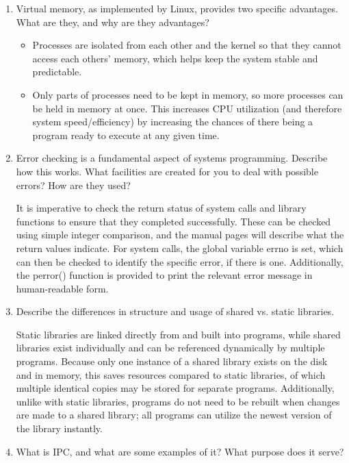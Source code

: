 \documentclass[letterpaper,10pt,onecolumn,titlepage]{article}
\begin{document}
\begin{enumerate}[itemsep=0.1 in]
\item Virtual memory, as implemented by Linux, provides two specific advantages. What are
  they, and why are they advantages?

  \begin{itemize}
    \item Processes are isolated from each other and the kernel so that they cannot access each others' memory, which helps keep the system stable and predictable.
    \item Only parts of processes need to be kept in memory, so more processes can be held in memory at once.  This increases CPU utilization (and therefore system speed/efficiency) by increasing the chances of there being a program ready to execute at any given time.
  \end{itemize}

\item Error checking is a fundamental aspect of systems programming. Describe how this
  works. What facilities are created for you to deal with possible errors? How are they
  used?

  It is imperative to check the return status of system calls and library functions to ensure that they completed successfully.  These can be checked using simple integer comparison, and the manual pages will describe what the return values indicate.  For system calls, the global variable errno is set, which can then be checked to identify the specific error, if there is one.  Additionally, the perror() function is provided to print the relevant error message in human-readable form.

\item Describe the differences in structure and usage of shared vs. static libraries.

Static libraries are linked directly from and built into programs, while shared libraries exist individually and can be referenced dynamically by multiple programs.  Because only one instance of a shared library exists on the disk and in memory, this saves resources compared to static libraries, of which multiple identical copies may be stored for separate programs.  Additionally, unlike with static libraries, programs do not need to be rebuilt when changes are made to a shared library; all programs can utilize the newest version of the library instantly.

\item What is IPC, and what are some examples of it? What purpose does it serve?


\end{enumerate}
\end{document}
